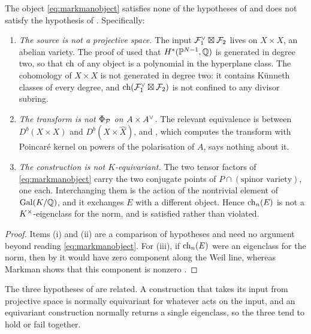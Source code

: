 \begin{proposition}\label{prop:whichescaped}
The object \eqref{eq:markmanobject} satisfies none of the hypotheses of
 and does not satisfy the hypothesis of
. Specifically:
\begin{enumerate}[label=\textup{(\roman*)}]
\item \emph{The source is not a projective space.} The input
  $\mathcal{F}_{1}^{\vee}\boxtimes\mathcal{F}_{2}$ lives on $X\times X$, an abelian variety.
  The proof of  used that $H^{*}(\mathbb{P}^{N-1},\mathbb{Q})$ is generated
  in degree two, so that $\operatorname{ch}$ of any object is a polynomial in the hyperplane
  class. The cohomology of $X\times X$ is not generated in degree two: it
  contains K\"unneth classes of every degree, and $\operatorname{ch}(\mathcal{F}_{1}^{\vee}\boxtimes\mathcal{F}_{2})$
  is not confined to any divisor subring.
\item \emph{The transform is not $\Phi_{\mathcal{P}}$ on $A\times A^{\vee}$.} The relevant
  equivalence is between $D^{b}(X\times X)$ and $D^{b}(X\times\widehat{X})$,
  and , which computes the transform with Poincar\'e kernel
  on powers of the polarisation of $A$, says nothing about it.
\item \emph{The construction is not $K$-equivariant.} The two tensor factors
  of \eqref{eq:markmanobject} carry the two conjugate points of
  $P\cap(\text{spinor variety})$, one each. Interchanging them is the action of
  the nontrivial element of $\operatorname{Gal}(K/\mathbb{Q})$, and it exchanges $E$ with a
  different object. Hence $\operatorname{ch}_{n}(E)$ is not a $K^{\times}$-eigenclass for the norm,
  and  is satisfied rather than violated.
\end{enumerate}
\end{proposition}

\begin{proof}
Items (i) and (ii) are a comparison of hypotheses and need no argument beyond
reading \eqref{eq:markmanobject}. For (iii), if $\operatorname{ch}_{n}(E)$ were an
eigenclass for the norm, then by  it would have zero
component along the Weil line, whereas Markman shows that this component is
nonzero \cite{Mar25b}.
\end{proof}

The three hypotheses of  are related. A construction
that takes its input from projective space is normally equivariant for
whatever acts on the input, and an equivariant construction normally returns
a single eigenclass, so the three tend to hold or fail together.

